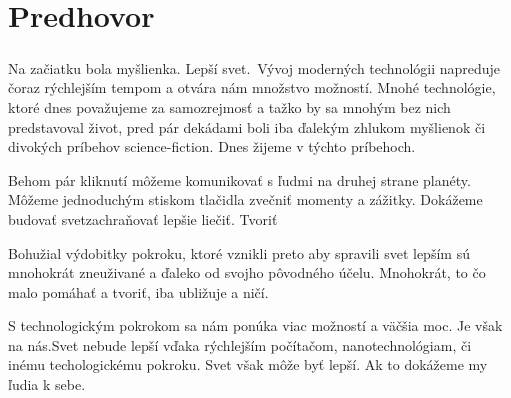 \chapter{Predhovor}

\paragraph{}
Na začiatku bola myšlienka. Lepší svet.\
Vývoj moderných technológii napreduje čoraz rýchlejším tempom a otvára nám množstvo možností. Mnohé technológie, ktoré dnes považujeme za samozrejmosť a tažko by sa mnohým bez nich predstavoval život, pred pár dekádami boli iba ďalekým zhlukom myšlienok či divokých príbehov science-fiction. Dnes žijeme v týchto príbehoch. \

Behom pár kliknutí môžeme komunikovať s ľudmi na druhej strane planéty. Môžeme jednoduchým stiskom tlačidla zvečniť momenty a zážitky. Dokážeme budovať svetzachraňovať lepšie liečiť. Tvoriť

Bohužial výdobitky pokroku, ktoré vznikli preto aby spravili svet lepším sú mnohokrát zneuživané a ďaleko od svojho pôvodného účelu. Mnohokrát, to čo malo pomáhať a tvoriť, iba ubližuje a ničí. \


S technologickým pokrokom sa nám ponúka viac možností a väčšia moc. Je však na nás.Svet nebude lepší vďaka rýchlejším počítačom, nanotechnológiam, či inému techologickému pokroku. Svet však môže byť lepší. Ak to dokážeme my ľudia k sebe.









